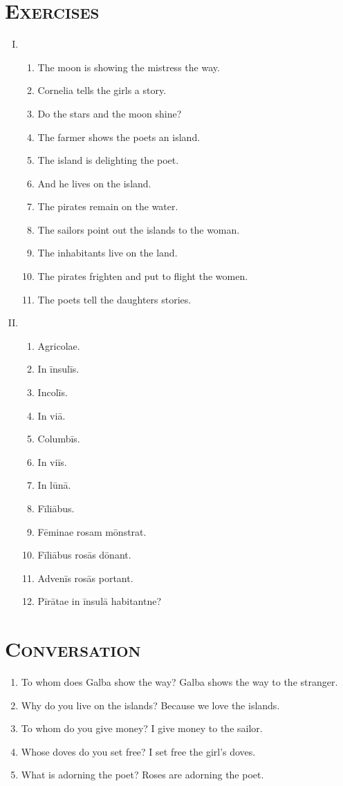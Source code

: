 \documentclass[12pt]{article}
\begin{document}
\section{\textsc{Exercises}}
\begin{enumerate}[I.]
	\setlength{\itemsep}{1em}
	\item \begin{enumerate}[1)]
		\item The moon is showing the mistress the way.
		\item Cornelia tells the girls a story.
		\item Do the stars and the moon shine?
		\item The farmer shows the poets an island.
		\item The island is delighting the poet.
		\item And he lives on the island.
		\item The pirates remain on the water.
		\item The sailors point out the islands to the woman.
		\item The inhabitants live on the land.
		\item The pirates frighten and put to flight the women.
		\item The poets tell the daughters stories.
	\end{enumerate}
	\item \begin{enumerate}[1)]
		\item Agricolae.
		\item In īnsulīs.
		\item Incolīs.
		\item In viā.
		\item Columbīs.
		\item In viīs.
		\item In lūnā.
		\item Fīliābus.
		\item Fēminae rosam mōnstrat.
		\item Fīliābus rosās dōnant.
		\item Advenīs rosās portant.
		\item Pīrātae in īnsulā habitantne?
	\end{enumerate}
\end{enumerate}

\section{\textsc{Conversation}}
\begin{enumerate}[1.]
	\item To whom does Galba show the way? Galba shows the way to the stranger.
	\item Why do you live on the islands? Because we love the islands.
	\item To whom do you give money? I give money to the sailor.
	\item Whose doves do you set free? I set free the girl's doves.
	\item What is adorning the poet? Roses are adorning the poet.
\end{enumerate}
\end{document}
